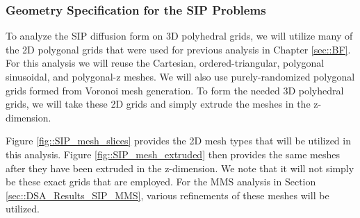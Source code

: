 \subsubsection{Geometry Specification for the SIP Problems}
\label{sec::DSA_Results_SIP_Geometry}

To analyze the SIP diffusion form on 3D polyhedral grids, we will utilize many of the 2D polygonal grids that were used for previous analysis in Chapter \ref{sec::BF}. For this analysis we will reuse the Cartesian, ordered-triangular, polygonal sinusoidal, and polygonal-z meshes. We will also use purely-randomized polygonal grids formed from Voronoi mesh generation. To form the needed 3D polyhedral grids, we will take these 2D grids and simply extrude the meshes in the z-dimension. 

Figure \ref{fig::SIP_mesh_slices} provides the 2D mesh types that will be utilized in this analysis. Figure \ref{fig::SIP_mesh_extruded} then provides the same meshes after they have been extruded in the z-dimension. We note that it will not simply be these exact grids that are employed. For the MMS analysis in Section \ref{sec::DSA_Results_SIP_MMS}, various refinements of these meshes will be utilized.

